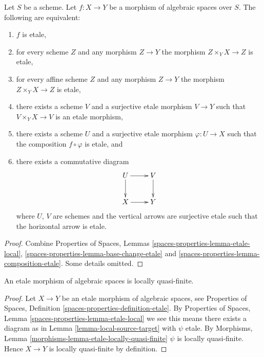 \begin{lemma}
\label{lemma-etale-local}
Let $S$ be a scheme.
Let $f : X \to Y$ be a morphism of algebraic spaces over $S$.
The following are equivalent:
\begin{enumerate}
\item $f$ is etale,
\item for every scheme $Z$ and any morphism $Z \to Y$ the morphism
$Z \times_Y X \to Z$ is etale,
\item for every affine scheme $Z$ and any morphism
$Z \to Y$ the morphism $Z \times_Y X \to Z$ is etale,
\item there exists a scheme $V$ and a surjective etale morphism
$V \to Y$ such that $V \times_Y X \to V$ is an etale morphism,
\item there exists a scheme $U$ and a surjective etale morphism
$\varphi : U \to X$ such that the composition $f \circ \varphi$
is etale, and
\item there exists a commutative diagram
$$
\xymatrix{
U \ar[d] \ar[r] & V \ar[d] \\
X \ar[r] & Y
}
$$
where $U$, $V$ are schemes and the vertical arrows are surjective etale
such that the horizontal arrow is etale.
\end{enumerate}
\end{lemma}

\begin{proof}
Combine
Properties of Spaces, Lemmas
\ref{spaces-properties-lemma-etale-local},
\ref{spaces-properties-lemma-base-change-etale} and
\ref{spaces-properties-lemma-composition-etale}.
Some details omitted.
\end{proof}



\begin{lemma}
\label{lemma-etale-locally-quasi-finite}
An etale morphism of algebraic spaces is locally quasi-finite.
\end{lemma}

\begin{proof}
Let $X \to Y$ be an etale morphism of algebraic spaces, see
Properties of Spaces, Definition \ref{spaces-properties-definition-etale}.
By
Properties of Spaces, Lemma \ref{spaces-properties-lemma-etale-local}
we see this means there exists a diagram as in
Lemma \ref{lemma-local-source-target}
with $\psi$ etale. By
Morphisms, Lemma \ref{morphisms-lemma-etale-locally-quasi-finite}
$\psi$ is locally quasi-finite. Hence $X \to Y$ is locally quasi-finite
by definition.
\end{proof}






